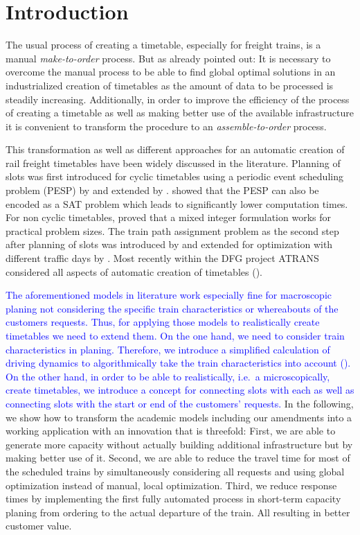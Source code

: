 \section{Introduction}
\label{chap:intro}
%
The usual process of creating a timetable, especially for freight trains, is a manual \emph{make-to-order} process. But as \cite{FP:2014} already pointed out: It is necessary to overcome the manual process to be able to find global optimal solutions in an industrialized creation of timetables as the amount of data to be processed is steadily increasing. Additionally, in order to improve the efficiency of the process of creating a timetable as well as making better use of the available infrastructure it is convenient to transform the procedure to an \emph{assemble-to-order} process.

This transformation as well as different approaches for an automatic creation of rail freight timetables have been widely discussed in the literature. Planning of slots was first introduced for cyclic timetables using a periodic event scheduling problem (PESP) by \cite{N:1998} and extended by \cite{O:2009}. \cite{G:2012} showed that the PESP can also be encoded as a SAT problem which leads to significantly lower computation times. For non cyclic timetables, \cite{G:2013} proved that a mixed integer formulation works for practical problem sizes. The train path assignment problem as the second step after planning of slots was introduced by \cite{NO:2014} and extended for optimization with different traffic days by \cite{N:2015}. Most recently within the DFG project ATRANS considered all aspects of automatic creation of timetables (\cite{CS, XL, RW}).

\textcolor{blue}{The aforementioned models in literature work especially fine for macroscopic planing not considering the specific train characteristics or whereabouts of the customers requests. Thus, for applying those models to realistically create timetables we need to extend them. On the one hand, we need to consider train characteristics in planing. Therefore, we introduce a simplified calculation of driving dynamics to algorithmically take the train characteristics into account (\cite{KP}). On the other hand, in order to be able to realistically, i.e.\ a microscopically, create timetables, we introduce a concept for connecting slots with each as well as connecting slots with the start or end of the customers' requests.}
In the following, we show how to transform the academic models including our amendments into a working application with an innovation that is threefold:
First, we are able to generate more capacity without actually building additional infrastructure but by making better use of it. Second, we are able to reduce the travel time for most of the scheduled trains by simultaneously considering all requests and using global optimization instead of manual, local optimization. Third, we reduce response times by implementing the first fully automated process in short-term capacity planing from ordering to the actual departure of the train. All resulting in better customer value.

